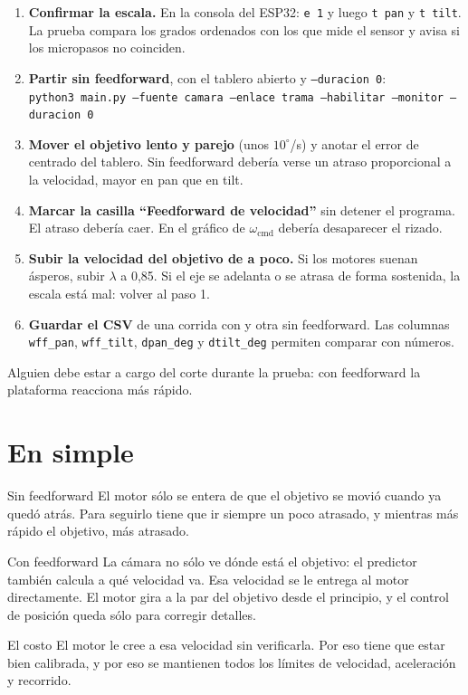 \documentclass[11pt,a4paper]{article}
\newcommand{\cod}[1]{\texttt{#1}}
\newcommand{\lam}{\lambda}
\newcommand{\gr}{^{\circ}}
\begin{document}
\begin{enumerate}
  \item \textbf{Confirmar la escala.} En la consola del ESP32: \cod{e 1} y luego \cod{t pan} y \cod{t tilt}. La
        prueba compara los grados ordenados con los que mide el sensor y avisa si los micropasos no coinciden.
  \item \textbf{Partir sin feedforward}, con el tablero abierto y \cod{--duracion 0}:\\
        \cod{python3 main.py --fuente camara --enlace trama --habilitar --monitor --duracion 0}
  \item \textbf{Mover el objetivo lento y parejo} (unos $10\gr$/s) y anotar el error de centrado del tablero. Sin
        feedforward debería verse un atraso proporcional a la velocidad, mayor en pan que en tilt.
  \item \textbf{Marcar la casilla ``Feedforward de velocidad''} sin detener el programa. El atraso debería caer.
        En el gráfico de $\omega_{\mathrm{cmd}}$ debería desaparecer el rizado.
  \item \textbf{Subir la velocidad del objetivo de a poco.} Si los motores suenan ásperos, subir $\lam$ a 0,85.
        Si el eje se adelanta o se atrasa de forma sostenida, la escala está mal: volver al paso 1.
  \item \textbf{Guardar el CSV} de una corrida con y otra sin feedforward. Las columnas \cod{wff\_pan},
        \cod{wff\_tilt}, \cod{dpan\_deg} y \cod{dtilt\_deg} permiten comparar con números.
\end{enumerate}

Alguien debe estar a cargo del corte durante la prueba: con feedforward la plataforma reacciona más rápido.

\section{En simple}

\begin{lamina}{Sin feedforward}
El motor sólo se entera de que el objetivo se movió cuando ya quedó atrás. Para seguirlo tiene que ir siempre un
poco atrasado, y mientras más rápido el objetivo, más atrasado.
\end{lamina}

\begin{lamina}{Con feedforward}
La cámara no sólo ve dónde está el objetivo: el predictor también calcula a qué velocidad va. Esa velocidad se le
entrega al motor directamente. El motor gira a la par del objetivo desde el principio, y el control de posición
queda sólo para corregir detalles.
\end{lamina}

\begin{lamina}{El costo}
El motor le cree a esa velocidad sin verificarla. Por eso tiene que estar bien calibrada, y por eso se mantienen
todos los límites de velocidad, aceleración y recorrido.
\end{lamina}
\end{document}
